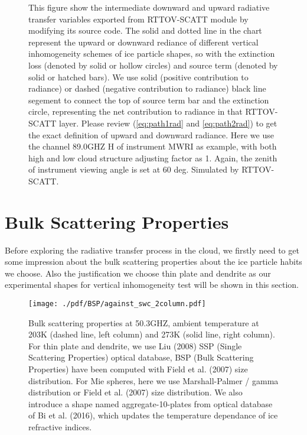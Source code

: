 \begin{figure}[hbtp] 
\centering
{}
\caption{This figure show the intermediate downward and upward radiative transfer variables 
exported from RTTOV-SCATT module by modifying its source code. 
The solid and dotted line in the chart represent the upward or downward rediance 
of different vertical inhomogeneity schemes of ice particle shapes, so with the extinction loss (denoted by solid or hollow circles)
and source term (denoted by solid or hatched bars).
We use solid (positive contribution to radiance) or dashed (negative contribution to radiance) black line segement 
to connect the top of source term bar and the extinction circle, representing the net contribution to radiance in that
RTTOV-SCATT layer. 
Please review (\ref{eq:path1rad} and \ref{eq:path2rad}) to get the exact definition of upward and downward radiance. 
Here we use the channel 89.0GHZ H of instrument MWRI as example, with both high and low cloud structure
adjusting factor as 1. Again, the zenith of instrument viewing angle is set at 60 deg. 
Simulated by RTTOV-SCATT.}
\label{fig:exrad}
\end{figure}

\clearpage

\section{Bulk Scattering Properties}
Before exploring the radiative transfer process in the cloud, we firstly need to get some impression about the bulk scattering properties 
about the ice particle habits we choose. Also the justification we choose thin plate and dendrite as our experimental shapes for vertical inhomogeneity
test will be shown in this section.

\begin{figure}[hbtp] 
\centering
\texttt{[image: ./pdf/BSP/against\_swc\_2column.pdf]}
\caption{Bulk scattering properties at 50.3GHZ, ambient temperature at 203K (dashed line, left column) and 273K (solid line, right column).
For thin plate and dendrite, we use Liu (2008) SSP (Single Scattering Properties) optical database,
BSP (Bulk Scattering Properties) have been computed with Field et al. (2007) size distribution.
For Mie spheres, here we use Marshall-Palmer / gamma distribution or Field et al. (2007) size distribution.
We also introduce a shape named aggregate-10-plates from optical database of Bi et al. (2016), which updates the temperature dependance 
of ice refractive indices.}
\label{fig:against_swc_2column}
\end{figure}

